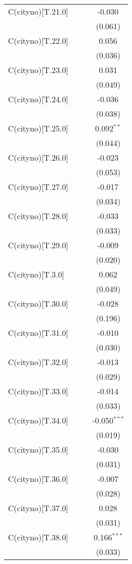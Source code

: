 \begin{table}[!htbp]
\begin{tabular}{@{\extracolsep{5pt}}lccc}
 C(cityno)[T.21.0] & & & -0.030$^{}$ \\
& & & (0.061) \\
 C(cityno)[T.22.0] & & & 0.056$^{}$ \\
& & & (0.036) \\
 C(cityno)[T.23.0] & & & 0.031$^{}$ \\
& & & (0.049) \\
 C(cityno)[T.24.0] & & & -0.036$^{}$ \\
& & & (0.038) \\
 C(cityno)[T.25.0] & & & 0.092$^{**}$ \\
& & & (0.044) \\
 C(cityno)[T.26.0] & & & -0.023$^{}$ \\
& & & (0.053) \\
 C(cityno)[T.27.0] & & & -0.017$^{}$ \\
& & & (0.034) \\
 C(cityno)[T.28.0] & & & -0.033$^{}$ \\
& & & (0.033) \\
 C(cityno)[T.29.0] & & & -0.009$^{}$ \\
& & & (0.020) \\
 C(cityno)[T.3.0] & & & 0.062$^{}$ \\
& & & (0.049) \\
 C(cityno)[T.30.0] & & & -0.028$^{}$ \\
& & & (0.196) \\
 C(cityno)[T.31.0] & & & -0.010$^{}$ \\
& & & (0.030) \\
 C(cityno)[T.32.0] & & & -0.013$^{}$ \\
& & & (0.029) \\
 C(cityno)[T.33.0] & & & -0.014$^{}$ \\
& & & (0.033) \\
 C(cityno)[T.34.0] & & & -0.050$^{***}$ \\
& & & (0.019) \\
 C(cityno)[T.35.0] & & & -0.030$^{}$ \\
& & & (0.031) \\
 C(cityno)[T.36.0] & & & -0.007$^{}$ \\
& & & (0.028) \\
 C(cityno)[T.37.0] & & & 0.028$^{}$ \\
& & & (0.031) \\
 C(cityno)[T.38.0] & & & 0.166$^{***}$ \\
& & & (0.033) \\

\end{tabular}
\end{table}
